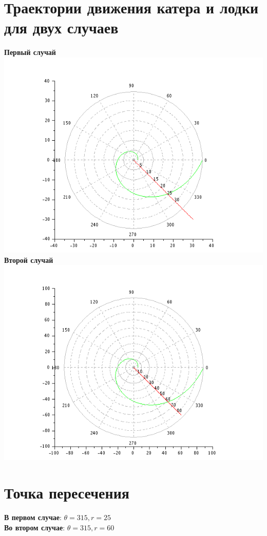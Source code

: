 \documentclass[unicode, 12pt, a4paper,oneside]{article}
\begin{document}
    \section{Траектории движения катера и лодки для двух случаев}
    {\bf Первый случай} \includegraphics[width=\textwidth]{var1.png}\\
    {\bf Второй случай} \includegraphics[width=\textwidth]{var2.png}\\
    \section{Точка пересечения}
    {\bf В первом случае}: $\theta = 315, r=25$\\
    {\bf Во втором случае}: $\theta = 315, r=60$
    
\end{document}
